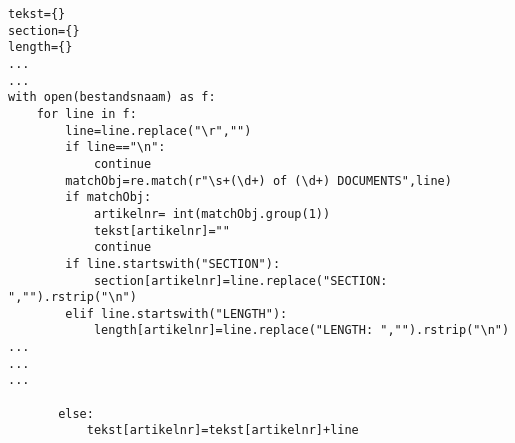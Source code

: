 \documentclass[compress]{beamer}
\begin{document}
{
	\begin{frame}[plain]
	\end{frame}
	\begin{frame}[plain]
	\end{frame}	
}
	
\begin{frame}
	\tiny
\begin{lstlisting}[basicstyle=\tiny]
tekst={}
section={}
length={}
...
...
with open(bestandsnaam) as f:
    for line in f:
        line=line.replace("\r","")
        if line=="\n":
            continue
        matchObj=re.match(r"\s+(\d+) of (\d+) DOCUMENTS",line)
        if matchObj:
            artikelnr= int(matchObj.group(1))
            tekst[artikelnr]=""
            continue
        if line.startswith("SECTION"):
            section[artikelnr]=line.replace("SECTION: ","").rstrip("\n")
        elif line.startswith("LENGTH"):
            length[artikelnr]=line.replace("LENGTH: ","").rstrip("\n")
...
...
...

       else:
           tekst[artikelnr]=tekst[artikelnr]+line
\end{lstlisting}

\end{frame}
	



\begin{frame}[plain]
    \printbibliography
\end{frame}
\end{document}
